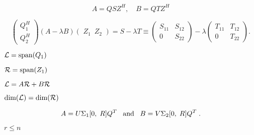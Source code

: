 {\newpage\clearpage
{}%
\begin{displaymath}
        A = Q S Z^H, \quad B = Q T Z^H
\end{displaymath}%
\lthtmldisplayZ
\lthtmlcheckvsize\clearpage}

{\newpage\clearpage
{}%
\begin{displaymath}
        \left( \begin{array}{c} Q^H_1 \\Q^H_2 \end{array} \right)
            (A - \lambda B) \left( \,\, Z_1 \,\,\, Z_2 \,\, \right)
            = S - \lambda T \equiv
        \left( \begin{array}{cc} S_{11} & S_{12} \\
                                     0  & S_{22} \end{array} \right)
        - \lambda \left( \begin{array}{cc} T_{11} & T_{12} \\
                                               0  & T_{22} \end{array} \right).
\end{displaymath}%
\lthtmldisplayZ
\lthtmlcheckvsize\clearpage}

{\newpage\clearpage
{}%
${\cal{L}} = \mbox{span}(Q_1)$%
\lthtmlinlinemathZ
\lthtmlcheckvsize\clearpage}

{\newpage\clearpage
{}%
${\cal{R}} = \mbox{span}(Z_1)$%
\lthtmlinlinemathZ
\lthtmlcheckvsize\clearpage}

{\newpage\clearpage
{}%
${\cal{L}} = A{\cal{R}} + B{\cal{R}}$%
\lthtmlinlinemathZ
\lthtmlcheckvsize\clearpage}

{\newpage\clearpage
{}%
$\mbox{dim}(\cal{L}) = \mbox{dim}(\cal{R})$%
\lthtmlinlinemathZ
\lthtmlcheckvsize\clearpage}

{\newpage\clearpage
{}%
\begin{displaymath}
A = U \Sigma_1 [0,\; R ] Q^T
\;\;\; {\rm and} \;\;\;
B = V \Sigma_2 [0, \; R ] Q^T \;.
\end{displaymath}%
\lthtmldisplayZ
\lthtmlcheckvsize\clearpage}

{\newpage\clearpage
{}%
$r \leq n$%
\lthtmlinlinemathZ
\lthtmlcheckvsize\clearpage}


